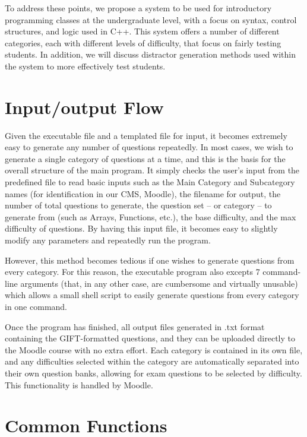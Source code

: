 \documentclass{article}
\begin{document}
To address these points, we propose a system to be used for introductory programming classes at the undergraduate level, with a focus on syntax, control structures, and logic used in C++. This system offers a number of different categories, each with different levels of difficulty, that focus on fairly testing students. In addition, we will discuss distractor generation methods used within the system to more effectively test students.

\section{Input/output Flow}

Given the executable file and a templated file for input, it becomes extremely easy to generate any number of questions
repeatedly. In most cases, we wish to generate a single category of questions at a time, and this is the basis for the
overall structure of the main program. It simply checks the user's input from the predefined file to read basic inputs
such as the Main Category and Subcategory names (for identification in our CMS, Moodle), the filename for output, the number of
total questions to generate, the question set -- or category -- to generate from (such as Arrays, Functions, etc.),
the base difficulty, and the max difficulty of questions. By having this input file, it becomes easy to slightly modify
any parameters and repeatedly run the program.

However, this method becomes tedious if one wishes to generate questions from every category. For this reason, the
executable program also excepts 7 command-line arguments (that, in any other case, are cumbersome and virtually
unusable) which allows a small shell script to easily generate questions from every category in one command.

Once the program has finished, all output files generated in .txt format containing the GIFT-formatted questions, and they can be uploaded
directly to the Moodle course with no extra effort. Each category is contained in its own file, and any
difficulties selected within the category are automatically separated into their own question banks, allowing
for exam questions to be selected by difficulty. This functionality is handled by Moodle.


\section{Common Functions}
\end{document}
